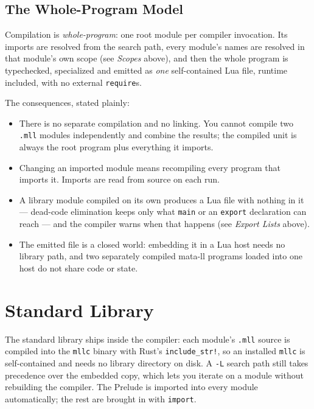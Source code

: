 \documentclass[11pt,a4paper]{article}
\begin{document}
\subsection{The Whole-Program Model}
\label{sec:whole-program}

Compilation is \emph{whole-program}: one root module per compiler
invocation.  Its imports are resolved from the search path, every
module's names are resolved in that module's own scope (see
\emph{Scopes} above), and then the whole program is
typechecked, specialized and emitted as \emph{one} self-contained Lua
file, runtime included, with no external \texttt{require}s.

The consequences, stated plainly:

\begin{itemize}
\item There is no separate compilation and no linking.  You cannot
  compile two \texttt{.mll} modules independently and combine the
  results; the compiled unit is always the root program plus
  everything it imports.
\item Changing an imported module means recompiling every program
  that imports it.  Imports are read from source on each run.
\item A library module compiled on its own produces a Lua file with
  nothing in it --- dead-code elimination keeps only what
  \texttt{main} or an \texttt{export} declaration can reach --- and
  the compiler warns when that happens (see \emph{Export Lists}
  above).
\item The emitted file is a closed world: embedding it in a Lua host
  needs no library path, and two separately compiled mata-ll programs
  loaded into one host do not share code or state.
\end{itemize}

\section{Standard Library}
\label{sec:stdlib}

The standard library ships inside the compiler: each module's
\texttt{.mll} source is compiled into the \texttt{mllc} binary with
Rust's \texttt{include\_str!}, so an installed \texttt{mllc} is
self-contained and needs no library directory on disk. A \texttt{-L}
search path still takes precedence over the embedded copy, which lets
you iterate on a module without rebuilding the compiler. The Prelude is
imported into every module automatically; the rest are brought in with
\texttt{import}.
\end{document}
